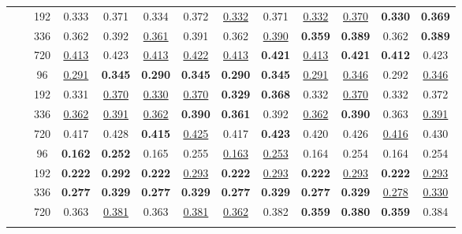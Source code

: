 \begin{table*}[!ht]
{\begin{tabular}{c|c|c|cc|cc|cc|cc|cc}
    		 & & 192 &  0.333 & 0.371 &  0.334 & 0.372 &  \underline{0.332} & 0.371 &  \underline{0.332} & \underline{0.370} &  \textbf{0.330} & \textbf{0.369} \\
    		 & & 336 &  0.362 & 0.392 &  \underline{0.361} & 0.391 &  0.362 & \underline{0.390} &  \textbf{0.359} & \textbf{0.389} &  0.362 & \textbf{0.389} \\
    		 & & 720 &  \underline{0.413} & 0.423 &  \underline{0.413} & \underline{0.422} &  \underline{0.413} & \textbf{0.421} &  \underline{0.413} & \textbf{0.421} &  \textbf{0.412} & 0.423 \\ \cmidrule{2-13}
    	& \multirow{4}{*}{\rotatebox[origin=c]{90}{\text{512}}}
    		 & 96 &  \underline{0.291} & \textbf{0.345} &  \textbf{0.290} & \textbf{0.345} &  \textbf{0.290} & \textbf{0.345} &  \underline{0.291} & \underline{0.346} &  0.292 & \underline{0.346} \\
    		 & & 192 &  0.331 & \underline{0.370} &  \underline{0.330} & \underline{0.370} &  \textbf{0.329} & \textbf{0.368} &  0.332 & \underline{0.370} &  0.332 & 0.372 \\
    		 & & 336 &  \underline{0.362} & \underline{0.391} &  \underline{0.362} & \textbf{0.390} &  \textbf{0.361} & 0.392 &  \underline{0.362} & \textbf{0.390} &  0.363 & \underline{0.391} \\
    		 & & 720 &  0.417 & 0.428 &  \textbf{0.415} & \underline{0.425} &  0.417 & \textbf{0.423} &  0.420 & 0.426 &  \underline{0.416} & 0.430 \\
    	\midrule
    	\multirow{8}{*}{\rotatebox[origin=c]{90}{\text{ETTm2}}}
    	& \multirow{4}{*}{\rotatebox[origin=c]{90}{\text{336}}}
    		 & 96 &  \textbf{0.162} & \textbf{0.252} &  0.165 & 0.255 &  \underline{0.163} & \underline{0.253} &  0.164 & 0.254 &  0.164 & 0.254 \\
    		 & & 192 &  \textbf{0.222} & \textbf{0.292} &  \textbf{0.222} & \underline{0.293} &  \textbf{0.222} & \underline{0.293} &  \textbf{0.222} & \underline{0.293} &  \textbf{0.222} & \underline{0.293} \\
    		 & & 336 &  \textbf{0.277} & \textbf{0.329} &  \textbf{0.277} & \textbf{0.329} &  \textbf{0.277} & \textbf{0.329} &  \textbf{0.277} & \textbf{0.329} &  \underline{0.278} & \underline{0.330} \\
    		 & & 720 &  0.363 & \underline{0.381} &  0.363 & \underline{0.381} &  \underline{0.362} & 0.382 &  \textbf{0.359} & \textbf{0.380} &  \textbf{0.359} & 0.384 \\ \cmidrule{2-13}
    	& \multirow{4}{*}{\rotatebox[origin=c]{90}{\text{512}}}

\end{tabular}}
\end{table*}
